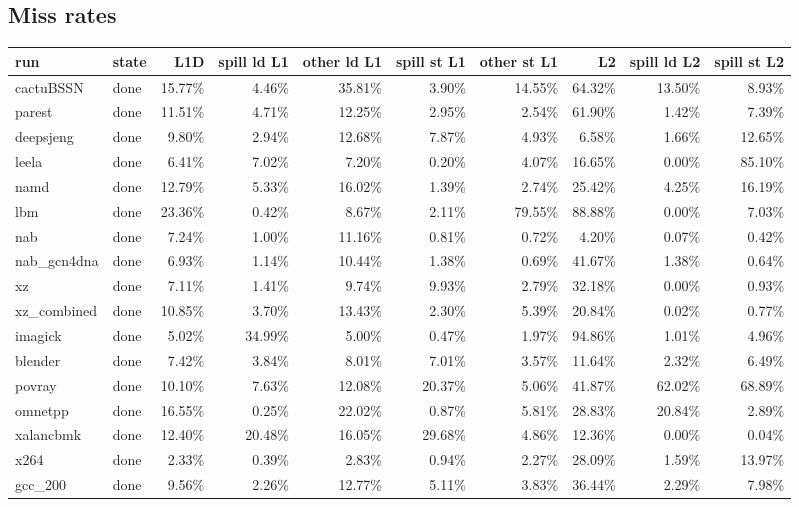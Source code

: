 \documentclass[10pt,a4paper,landscape]{article}
\begin{document}
\subsection*{Miss rates}
{\footnotesize
\begin{longtable}{llrrrrrrrr}
\toprule
run & state & L1D & spill ld L1 & other ld L1 & spill st L1 & other st L1 & L2 & spill ld L2 & spill st L2 \\
\midrule
\endhead
\bottomrule
\endfoot
cactuBSSN & done & 15.77\% & 4.46\% & 35.81\% & 3.90\% & 14.55\% & 64.32\% & 13.50\% & 8.93\% \\
parest & done & 11.51\% & 4.71\% & 12.25\% & 2.95\% & 2.54\% & 61.90\% & 1.42\% & 7.39\% \\
deepsjeng & done & 9.80\% & 2.94\% & 12.68\% & 7.87\% & 4.93\% & 6.58\% & 1.66\% & 12.65\% \\
leela & done & 6.41\% & 7.02\% & 7.20\% & 0.20\% & 4.07\% & 16.65\% & 0.00\% & 85.10\% \\
namd & done & 12.79\% & 5.33\% & 16.02\% & 1.39\% & 2.74\% & 25.42\% & 4.25\% & 16.19\% \\
lbm & done & 23.36\% & 0.42\% & 8.67\% & 2.11\% & 79.55\% & 88.88\% & 0.00\% & 7.03\% \\
nab & done & 7.24\% & 1.00\% & 11.16\% & 0.81\% & 0.72\% & 4.20\% & 0.07\% & 0.42\% \\
nab\_gcn4dna & done & 6.93\% & 1.14\% & 10.44\% & 1.38\% & 0.69\% & 41.67\% & 1.38\% & 0.64\% \\
xz & done & 7.11\% & 1.41\% & 9.74\% & 9.93\% & 2.79\% & 32.18\% & 0.00\% & 0.93\% \\
xz\_combined & done & 10.85\% & 3.70\% & 13.43\% & 2.30\% & 5.39\% & 20.84\% & 0.02\% & 0.77\% \\
imagick & done & 5.02\% & 34.99\% & 5.00\% & 0.47\% & 1.97\% & 94.86\% & 1.01\% & 4.96\% \\
blender & done & 7.42\% & 3.84\% & 8.01\% & 7.01\% & 3.57\% & 11.64\% & 2.32\% & 6.49\% \\
povray & done & 10.10\% & 7.63\% & 12.08\% & 20.37\% & 5.06\% & 41.87\% & 62.02\% & 68.89\% \\
omnetpp & done & 16.55\% & 0.25\% & 22.02\% & 0.87\% & 5.81\% & 28.83\% & 20.84\% & 2.89\% \\
xalancbmk & done & 12.40\% & 20.48\% & 16.05\% & 29.68\% & 4.86\% & 12.36\% & 0.00\% & 0.04\% \\
x264 & done & 2.33\% & 0.39\% & 2.83\% & 0.94\% & 2.27\% & 28.09\% & 1.59\% & 13.97\% \\
gcc\_200 & done & 9.56\% & 2.26\% & 12.77\% & 5.11\% & 3.83\% & 36.44\% & 2.29\% & 7.98\% \\

\end{longtable}}
\end{document}
